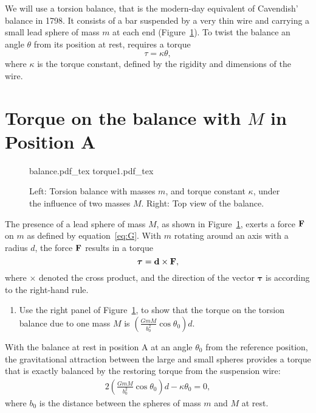 \documentclass{article}
\begin{document}
We will use a torsion balance, that is the modern-day equivalent of
Cavendish' balance in 1798. It consists of a bar suspended by a very
thin wire and carrying a small lead sphere of mass $m$ at each end
(Figure~\ref{fig:balance}). To twist the balance an angle $\theta$ from
its position at rest, requires a torque $$\tau = \kappa \theta,$$
where $\kappa$ is the torque constant, defined by the rigidity and
dimensions of the wire.

\section*{Torque on the balance with $M$ in Position A}
\begin{figure}
  \centering
  \def\svgwidth{0.4\columnwidth}
  {balance.pdf_tex}\hspace{2cm}
  \def\svgwidth{0.45\columnwidth}
  {torque1.pdf_tex}
  \caption{Left: Torsion balance with masses $m$, and torque constant
    $\kappa$, under the influence of two masses $M$. Right: Top view
    of the balance.}
  \label{fig:balance}
\end{figure}
The presence of a lead sphere of mass $M$,
as shown in Figure~\ref{fig:balance}, exerts a force ${\bf F}$ on $m$
as defined by equation~\ref{eq:G}.  With $m$ rotating around an axis
with a radius $d$, the force ${\bf F}$ results in a torque
\begin{equation}
  \boldsymbol{\tau} = {\bf d} \times {\bf F},
  \label{eq:tau}
\end{equation}
where $\times$ denoted the cross product, and the direction of the
vector $\boldsymbol{\tau}$ is according to the right-hand rule.

\begin{enumerate}
\item Use the right panel of Figure~\ref{fig:balance}, to show that
  the torque on the torsion balance due to one mass $M$ is $\left(
    \frac{GmM}{b_0^{2}}\cos\theta_{0}\right) d $.
\end{enumerate}

With the balance at rest in position A at an angle $\theta_0$ from
the reference position, the gravitational attraction between the large
and small spheres provides a torque that is exactly balanced by the
restoring torque from the suspension wire:
\begin{align}
  2\left(  \frac{GmM}{b_0^{2}}\cos\theta_{0}\right)  d - \kappa\theta_{0}=0,
  \label{eqn:basic}%
\end{align}
where $b_0$ is the distance between the spheres of mass $m$ and $M$ at
rest.
\end{document}
